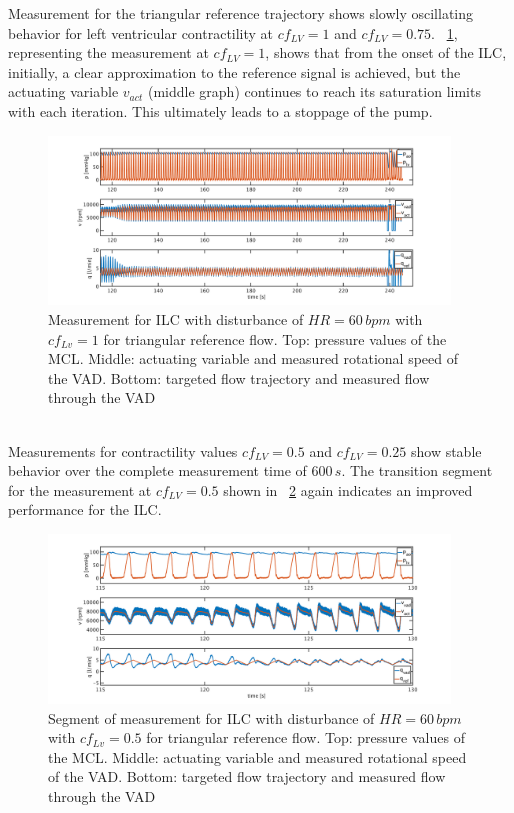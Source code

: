 Measurement for the triangular reference trajectory shows slowly oscillating behavior for left ventricular contractility at $cf_{LV}=1$ and $cf_{LV}=0.75$. \figurename~\ref{fig:pi_to_ilc_dist_triang_cf1}, representing the measurement at $cf_{LV}=1$, shows that from the onset of the ILC, initially, a clear approximation to the reference signal is achieved, but the actuating variable $v_{act}$ (middle graph) continues to reach its saturation limits with each iteration. This ultimately leads to a stoppage of the pump.
\begin{figure}[ht!]
  \centering
  \includegraphics[width=0.95\textwidth]{images/chapt_5/ILC/pi_to_ilc_dist_triang_cf1.pdf}
  \caption[Measurement for ILC with disturbance of $HR=60\,bpm$ with $cf_{Lv}=1$ for triangular reference flow]{Measurement for ILC with disturbance of $HR=60\,bpm$ with $cf_{Lv}=1$ for triangular reference flow. Top:  pressure values of the MCL. Middle: actuating variable and measured rotational speed of the VAD. Bottom: targeted flow trajectory and measured flow through the VAD}
  \label{fig:pi_to_ilc_dist_triang_cf1}
\end{figure}
\\Measurements for contractility values $cf_{LV}=0.5$ and $cf_{LV}=0.25$ show stable behavior over the complete measurement time of $600\,s$. The transition segment for the measurement at $cf_{LV}=0.5$ shown in \figurename~\ref{fig:pi_to_ilc_dist_triang_cf50} again indicates an improved performance for the ILC.
\begin{figure}[ht!]
  \centering
  \includegraphics[width=0.95\textwidth]{images/chapt_5/ILC/pi_to_ilc_dist_triang_cf50.pdf}
  \caption[]{Segment of measurement for ILC with disturbance of $HR=60\,bpm$ with $cf_{Lv}=0.5$ for triangular reference flow. Top:  pressure values of the MCL. Middle: actuating variable and measured rotational speed of the VAD. Bottom: targeted flow trajectory and measured flow through the VAD}
  \label{fig:pi_to_ilc_dist_triang_cf50}
\end{figure}
